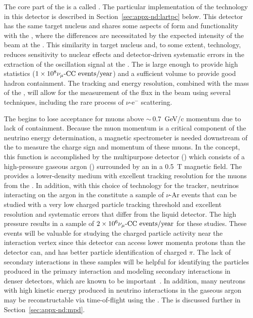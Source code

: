 The core part of the   is a  called .  The particular implementation of the  technology in this detector is described in Section~\ref{sec:appx-nd:lartpc} below.  
This detector has the same target nucleus and shares some aspects of form and functionality with the , where the differences are necessitated by the expected intensity of the beam at the .  This similarity in target nucleus and, to some extent, technology, reduces sensitivity to nuclear effects and detector-driven systematic errors in the extraction of the oscillation signal at the  .  The  is large enough to provide high statistics ($\num{1e8}{\numu \text{-CC events/year}}$) and a sufficient volume to provide good hadron containment.  The tracking and energy resolution, combined with the mass of the , will allow for the measurement of the flux in the beam using several techniques, including the rare process of $\nu$-e$^{-}$ scattering.

The  begins to lose acceptance for muons above $\sim\,$\SI{0.7}{GeV/c} momentum due to lack of containment.  Because the muon momentum is a critical component of the neutrino energy determination, a magnetic spectrometer is needed downstream of the  to measure the charge sign and momentum of these muons.  In the   concept, this function is accomplished by the multipurpose detector () which consists of a high-pressure gaseous argon  () surrounded by an  in a \SI{0.5}{T} magnetic field. The  provides a lower-density medium with excellent tracking resolution for the muons from the .  In addition, with this choice of technology for the tracker, neutrinos interacting on the argon in the %
 constitute a sample of $\nu$-Ar events that can be studied with a very low charged particle tracking threshold and excellent resolution and systematic errors that differ from the liquid detector. The high pressure results in a sample of $\num{2e6}{\numu \text{-CC events/year}}$ for these studies. These events will be valuable for studying the charged particle activity near the interaction vertex since this detector can access lower momenta protons than the  detector can, and has better particle identification of charged $\pi$.  The lack of secondary interactions in these samples will be helpful for identifying the particles produced in the primary interaction and modeling secondary interactions in denser detectors, which are known to be important~\cite{Friedland:2018vry}.
In addition, many neutrons with high kinetic energy produced in neutrino interactions in the gaseous argon may be reconstructable via time-of-flight using the .    
The  is  discussed further in Section~\ref{sec:appx-nd:mpd}.

